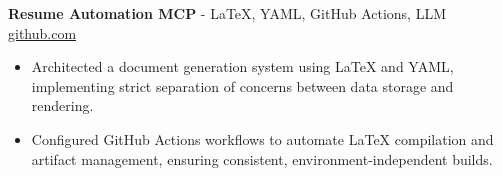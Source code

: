 \documentclass[11pt]{article}
\begin{document}
\textbf{Resume Automation MCP}{ - LaTeX, YAML, GitHub Actions, LLM} \hfill \href{https://github.com/Monica20030707/Tex_OrangeLeaf-mcp}{github.com}
\vspace{-9pt}
\begin{itemize}
  \item Architected a document generation system using LaTeX and YAML, implementing strict separation of concerns between data storage and rendering.
  \item Configured GitHub Actions workflows to automate LaTeX compilation and artifact management, ensuring consistent, environment-independent builds.
\end{itemize}

\end{document}
